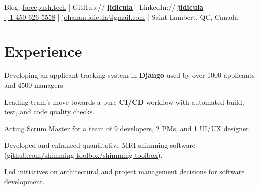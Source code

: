 \documentclass[]{jidicula-resume}
\begin{document}
\lastupdated{}


{ Blog: \href{http://bit.ly/jidicula-site}{forcepush.tech}
  | GitHub:// \href{http://bit.ly/jidicula_github}{\bf jidicula} | LinkedIn:// \href{https://bit.ly/jidicula-linkedin}{\bf jidicula} \\
  \href{tel:14506265558}{+1-450-626-5558}
  | \href{mailto:johanan.idicula+resume@gmail.com}{johanan.idicula@gmail.com}
  | Saint-Lambert, QC, Canada}

\section{Experience}

\vspace{\topsep} %
\begin{tightemize}
\item Developing an applicant tracking system in \textbf{Django} used by over 1000 applicants and 4500 managers.
\item Leading team's move towards a pure \textbf{CI/CD} workflow with automated build, test, and code quality checks.
\item Acting Scrum Master for a team of 9 developers, 2 PMs, and 1 UI/UX designer.
\end{tightemize}
\sectionsep{}

\vspace{\topsep} %
\begin{tightemize}
\item Developed and enhanced quantitative MRI shimming software (\href{http://bit.ly/jidicula-shimming-toolbox}{github.com/shimming-toolbox/shimming-toolbox}).
\item Led initiatives on architectural and project management decisions for software development.
\end{tightemize}
\sectionsep{}
\end{document}
